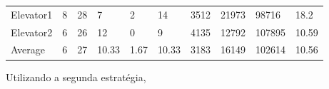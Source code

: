 ﻿\documentclass[a4paper]{article}
\begin{document}
\begin{table}[h]
\begin{tabular}{@{}llllllllll@{}}
Elevator1 & 8        & 28            & 7           & 2                                                               & 14                                                                  & 3512                                                         & 21973                                                 & 98716                                                   & 18.2        \\
Elevator2 & 6        & 26            & 12           & 0                                                               & 9                                                                  & 4135                                                         & 12792                                                 & 107895                                                   & 10.59         \\
Average   & 6     & 27         & 10.33        & 1.67                                                               & 10.33                                                               & 3183                                                         & 16149                                                 & 102614                                                   & 10.56          \\ \bottomrule
\end{tabular}
\end{table}

Utilizando a segunda estratégia,
\end{document}
